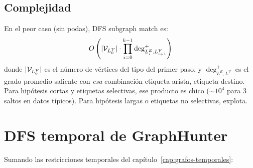 \begin{algorithm}[H]
\caption{DFS \emph{subgraph match}, hipótesis chain
\((L_0^V, L_0^E, L_1^V, L_1^E, \dots, L_k^V)\)}
\BlankLine
{}
\end{algorithm}

\subsection{Complejidad}

En el peor caso (sin podas), DFS subgraph match es:
\[
O\left(|\mathcal{V}_{L_0^V}| \cdot \prod_{i=0}^{k-1} \deg^{+}_{L_i^E, L_{i+1}^V}\right)
\]
donde \(|\mathcal{V}_{L_0^V}|\) es el número de vértices del tipo del primer
paso, y \(\deg^{+}_{L^E, L^V}\) es el grado promedio saliente con
\emph{esa} combinación etiqueta-arista, etiqueta-destino. Para
hipótesis cortas y etiquetas selectivas, ese producto es chico
($\sim 10^4$ para 3 saltos en datos típicos). Para hipótesis largas
o etiquetas no selectivas, explota.

\section{DFS temporal de GraphHunter}
\label{sec:dfs-temporal}

Sumando las restricciones temporales del capítulo~\ref{cap:grafos-temporales}:

